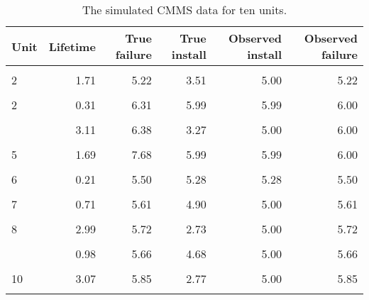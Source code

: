 \begin{table}
\centering
\caption{\label{tab:sim-cmms-data}The simulated CMMS data for ten units.}
\centering
\begin{tabular}[t]{lrrrrr}
\toprule
Unit & Lifetime & True failure & True install & Observed install & Observed failure\\
\midrule
\cellcolor{gray!10}{1} & \cellcolor{gray!10}{1.66} & \cellcolor{gray!10}{6.18} & \cellcolor{gray!10}{4.53} & \cellcolor{gray!10}{5.00} & \cellcolor{gray!10}{6.00}\\
2 & 1.71 & 5.22 & 3.51 & 5.00 & 5.22\\
\cellcolor{gray!10}{2} & \cellcolor{gray!10}{0.77} & \cellcolor{gray!10}{5.99} & \cellcolor{gray!10}{5.22} & \cellcolor{gray!10}{5.22} & \cellcolor{gray!10}{5.99}\\
2 & 0.31 & 6.31 & 5.99 & 5.99 & 6.00\\
\cellcolor{gray!10}{3} & \cellcolor{gray!10}{2.28} & \cellcolor{gray!10}{7.23} & \cellcolor{gray!10}{4.94} & \cellcolor{gray!10}{5.00} & \cellcolor{gray!10}{6.00}\\
\addlinespace
4 & 3.11 & 6.38 & 3.27 & 5.00 & 6.00\\
\cellcolor{gray!10}{5} & \cellcolor{gray!10}{2.14} & \cellcolor{gray!10}{5.99} & \cellcolor{gray!10}{3.85} & \cellcolor{gray!10}{5.00} & \cellcolor{gray!10}{5.99}\\
5 & 1.69 & 7.68 & 5.99 & 5.99 & 6.00\\
\cellcolor{gray!10}{6} & \cellcolor{gray!10}{1.12} & \cellcolor{gray!10}{5.28} & \cellcolor{gray!10}{4.16} & \cellcolor{gray!10}{5.00} & \cellcolor{gray!10}{5.28}\\
6 & 0.21 & 5.50 & 5.28 & 5.28 & 5.50\\
\addlinespace
\cellcolor{gray!10}{6} & \cellcolor{gray!10}{2.08} & \cellcolor{gray!10}{7.58} & \cellcolor{gray!10}{5.50} & \cellcolor{gray!10}{5.50} & \cellcolor{gray!10}{6.00}\\
7 & 0.71 & 5.61 & 4.90 & 5.00 & 5.61\\
\cellcolor{gray!10}{7} & \cellcolor{gray!10}{1.89} & \cellcolor{gray!10}{7.50} & \cellcolor{gray!10}{5.61} & \cellcolor{gray!10}{5.61} & \cellcolor{gray!10}{6.00}\\
8 & 2.99 & 5.72 & 2.73 & 5.00 & 5.72\\
\cellcolor{gray!10}{8} & \cellcolor{gray!10}{0.39} & \cellcolor{gray!10}{6.11} & \cellcolor{gray!10}{5.72} & \cellcolor{gray!10}{5.72} & \cellcolor{gray!10}{6.00}\\
\addlinespace
9 & 0.98 & 5.66 & 4.68 & 5.00 & 5.66\\
\cellcolor{gray!10}{9} & \cellcolor{gray!10}{0.46} & \cellcolor{gray!10}{6.12} & \cellcolor{gray!10}{5.66} & \cellcolor{gray!10}{5.66} & \cellcolor{gray!10}{6.00}\\
10 & 3.07 & 5.85 & 2.77 & 5.00 & 5.85\\
\cellcolor{gray!10}{10} & \cellcolor{gray!10}{1.03} & \cellcolor{gray!10}{6.88} & \cellcolor{gray!10}{5.85} & \cellcolor{gray!10}{5.85} & \cellcolor{gray!10}{6.00}\\
\bottomrule
\end{tabular}
\end{table}
